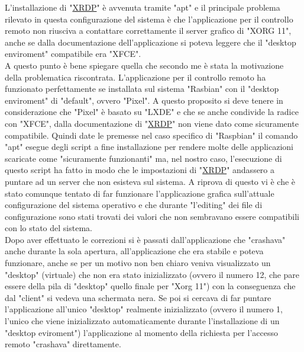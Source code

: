 L'installazione di "\href{https://github.com/neutrinolabs/xrdp}{XRDP}" è avvenuta tramite "apt" e il principale problema rilevato in questa configurazione del sistema è che l'applicazione per il controllo remoto non riusciva a contattare correttamente il server grafico di "XORG 11", anche se dalla documentazione dell'applicazione si poteva leggere che il "desktop enviroment" compatibile era "XFCE".\\
A questo punto è bene spiegare quella che secondo me è stata la motivazione della problematica riscontrata. L'applicazione per il controllo remoto ha funzionato perfettamente se installata sul sistema "Rasbian" con il "desktop enviroment" di "default", ovvero "Pixel". A questo proposito si deve tenere in considerazione che "Pixel" è basato su "LXDE" e che se anche condivide la radice con "XFCE", dalla documentazione di "\href{https://github.com/neutrinolabs/xrdp}{XRDP}" non viene dato come sicuramente compatibile. Quindi date le premesse nel caso specifico di "Raspbian" il comando "apt" esegue degli script a fine installazione per rendere molte delle applicazioni scaricate come "sicuramente funzionanti" ma, nel nostro caso, l'esecuzione di questo script ha fatto in modo che le impostazioni di "\href{https://github.com/neutrinolabs/xrdp}{XRDP}" andassero a puntare ad un server che non esisteva sul sistema. A riprova di questo vi è che è stato comunque tentato di far funzionare l'applicazione grafica sull'attuale configurazione del sistema operativo e che durante "l'editing" dei file di configurazione sono stati trovati dei valori che non sembravano essere compatibili con lo stato del sistema.\\
Dopo aver effettuato le correzioni si è passati dall'applicazione che "crashava" anche durante la sola apertura, all'applicazione che era stabile e poteva funzionare, anche se per un motivo non ben chiaro veniva visualizzato un "desktop" (virtuale) che non era stato inizializzato (ovvero il numero 12, che pare essere della pila di "desktop" quello finale per "Xorg 11") con la conseguenza che dal "client" si vedeva una schermata nera. Se poi si cercava di far puntare l'applicazione all'unico "desktop" realmente inizializzato  (ovvero il numero 1, l'unico che viene inizializzato automaticamente durante l'installazione di un "desktop eviroment") l'applicazione al momento della richiesta per l'accesso remoto "crashava" direttamente.\\

